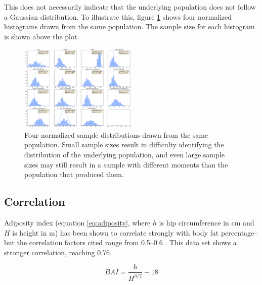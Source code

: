 \documentclass{IEEEtran}
\begin{document}
This does not necessarily indicate that the underlying population does not follow a Gaussian distribution. To illustrate this, figure \ref{fig:sample_size} shows four normalized histograms drawn from the same population. The sample size for each histogram is shown above the plot. 

\begin{centering}
\begin{figure}
\centering
\begin{center}
	\includegraphics[width=0.5\textwidth]{histogram_array}
	\caption{Four normalized sample distributions drawn from the same population. Small sample sizes result in difficulty identifying the distribution of the underlying population, and even large sample sizes may still result in a sample with different moments than the population that produced them.\label{fig:sample_size}}
\end{center}
\end{figure}
\end{centering}

\subsection{Correlation}

Adiposity index (equation \ref{eq:adiposity}, where $h$ is hip circumference in \si{\centi\meter} and $H$ is height in \si{\meter}) has been shown to correlate strongly with body fat percentage--but the correlation factors cited range from \numrange{0.5}{0.6} \cite{Bergman2011}. This data set shows a stronger correlation, reaching \num{0.76}.

\begin{equation}
	BAI = \frac{h}{H^{3/2}}-18
	\label{eq:adiposity}
\end{equation}
\end{document}
